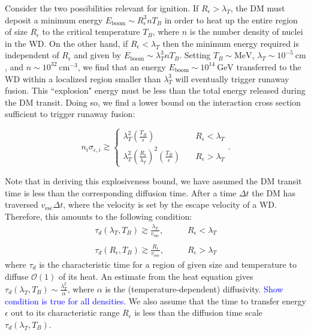 \documentclass[twocolumn,showpacs,preprintnumbers,amsmath,amssymb,prd]{revtex4}
\newcommand{\OO}{\mathcal{O}}
\def\r{\right)}
\def\l{\left(}
\begin{document}
Consider the two possibilities relevant for ignition. If $R_\epsilon> \lambda_T$, the DM must deposit a minimum energy $E_{\text{boom}} \sim R_\epsilon^3 n T_B$ in order to heat up the entire region of size $R_\epsilon$ to the critical temperature $T_B$, where $n$ is the number density of nuclei in the WD. On the other hand, if $R_\epsilon < \lambda_T$ then the minimum energy required is independent of $R_\epsilon$ and given by $E_{\text{boom}} \sim \lambda_T^3 n T_B$. Setting $T_B \sim \text{MeV}$, $\lambda_T \sim 10^{-5} ~\text{cm}$, and $n \sim 10^{32} ~\text{cm}^{-3}$, we find that an energy $E_{\text{boom}} \sim 10^{14} ~\text{GeV}$ transferred to the WD within a localized region smaller than $\lambda_T^3$ will eventually trigger runaway fusion. This ``explosion" energy must be less than the total energy released during the DM transit. Doing so, we find a lower bound on the interaction cross section sufficient to trigger runaway fusion:

\begin{equation}
\label{eq:explosion}
n_i \sigma_{\epsilon,i} \gtrsim \left\{
        \begin{array}{ll}
            \displaystyle \lambda_T^2 \l \frac{T_B}{\epsilon} \r & \quad R_\epsilon < \lambda_T \\
             \lambda_T^2 \l \frac{R_\epsilon}{\lambda_T}\r^2 \l \frac{T_B}{\epsilon} \r & \quad R_\epsilon > \lambda_T
        \end{array}
    \right..
\end{equation}

Note that in deriving this explosiveness bound, we have assumed the DM transit time is less than the corresponding diffusion time. After a time $\Delta t$ the DM has traversed $v_{\text{esc}} \Delta t$, where the velocity is set by the escape velocity of a WD. Therefore, this amounts to the following condition:
\begin{equation}
\begin{array}{ll}
             \tau_d(\lambda_T, T_B) \gtrsim \frac{\lambda_T}{v_{\text{esc}}}, & \quad \quad R_\epsilon < \lambda_T \\ \\
            \tau_d(R_\epsilon, T_B)  \gtrsim \frac{R_\epsilon}{v_{\text{esc}}},  & \quad \quad R_\epsilon > \lambda_T
        \end{array}
\end{equation}
where $\tau_d$ is the characteristic time for a region of given size and temperature to diffuse $\OO(1)$ of its heat. An estimate from the heat equation gives $\tau_d(\lambda_T, T_B) \sim \frac{\lambda_T^2}{\alpha}$, where $\alpha$ is the (temperature-dependent) diffusivity. \textcolor{blue}{Show condition is true for all densities.} We also assume that the time to transfer energy $\epsilon$ out to its characteristic range $R_\epsilon$ is less than the diffusion time scale $\tau_d(\lambda_T, T_B)$.
\end{document}
